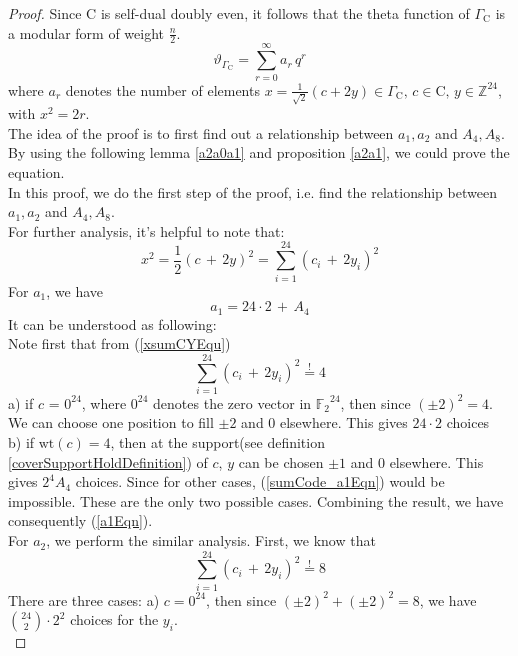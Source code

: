 \documentclass{article}
\numberwithin{equation}{theorem}
\numberwithin{figure}{theorem}
\newcommand{\Ftwo}{\ensuremath{\mathbb{F}_2}}
\newcommand{\simpleCodes}{\ensuremath{\mathrm{C}}}
\newcommand{\buildLattice}[1]{\ensuremath{\Gamma_{#1}}}
\newcommand{\thetaFunction}[1]{\ensuremath{\vartheta_{#1}}}
\newcommand{\wt}[1]{\ensuremath{\text{wt}(#1)}}
\newcommand{\Integer}{\ensuremath{\mathbb{Z}}}
\begin{document}
\begin{proof}
Since {\simpleCodes} is self-dual doubly even, it follows that the theta function of $\buildLattice{\simpleCodes}$ is a modular form of weight $\frac{n}{2}$.\\
\[
	\thetaFunction{\buildLattice{\simpleCodes}} = \sum_{r = 0}^{\infty} a_r \, q^r
\]
where $a_r$ denotes the number of elements $x = \frac{1}{\sqrt{2}}(c + 2y) \in \buildLattice{\simpleCodes},\, c \in \simpleCodes, \, y\in \Integer^{24}$, with $x^2 = 2r$. \\
The idea of the proof is to first find out a relationship between $a_1, a_2$ and $A_4, A_8$. By using the following lemma \ref{a2a0a1} and proposition \ref{a2a1}, we could prove the equation.\\
In this proof, we do the first step of the proof, i.e. find the relationship between $a_1, a_2$ and $A_4, A_8$.\\
For further analysis, it's helpful to note that:
\begin{equation}\label{xsumCYEqu}
	x^2 = \frac{1}{2}(c \,+\,2y)^2 = \sum_{i = 1}^{24}(c_i \, + \, 2y_i)^2
\end{equation}
For $a_1$, we have
\begin{equation}\label{a1Eqn}
	a_1 = 24 \cdot 2 \,+ \,A_4
\end{equation}
It can be understood as following:\\
Note first that from (\ref{xsumCYEqu})
\begin{equation}\label{sumCode_a1Eqn}
	\sum_{i = 1}^{24}(c_i \, + \, 2y_i)^2 \overset{!}{=} 4
\end{equation}
a) if $c$ = $0^{24}$, where $0^{24}$ denotes the zero vector in $\Ftwo^{24}$, then since $(\pm2)^2 = 4$. We can choose one position to fill $\pm2$ and 0 elsewhere. This gives $24 \cdot 2$ choices\\
b) if $\wt{c} = 4$, then at the support(see definition \ref{coverSupportHoldDefinition}) of $c$, $y$ can be chosen $\pm1$ and 0 elsewhere. This gives $2^4 A_4$ choices.
Since for other cases, (\ref{sumCode_a1Eqn}) would be impossible. These are the only two possible cases. Combining the result, we have consequently (\ref{a1Eqn}).\\
For $a_2$, we perform the similar analysis. First, we know that
\begin{equation}\label{sumCY_a2Eqn}
	\sum_{i = 1}^{24}(c_i \, + \, 2y_i)^2 \overset{!}{=} 8
\end{equation}
There are three cases:
a) $c = 0^{24}$, then since $(\pm2)^2 + (\pm2)^2 = 8$, we have $\binom{24}{2} \cdot 2^2$ choices for the $y_i$.\\

\end{proof}
\end{document}
